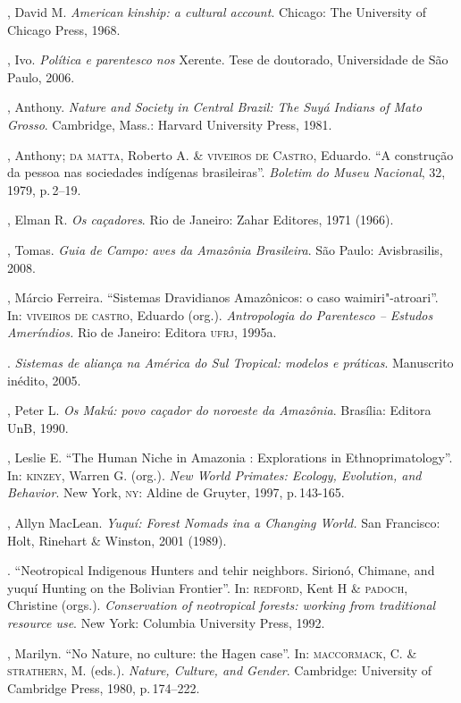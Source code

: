 \begin{bibliohedra}
, David M. \emph{American kinship: a cultural account}. Chicago: The
University of Chicago Press, 1968.

, Ivo. \emph{Política e parentesco nos} Xerente. Tese de
doutorado, Universidade de São Paulo, 2006.

, Anthony. \emph{Nature and Society in Central Brazil: The Suyá
Indians of Mato Grosso}. Cambridge, Mass.: Harvard University Press, 1981.

, Anthony; \textsc{da matta}, Roberto A. \& \textsc{viveiros de Castro}, Eduardo. ``A construção da pessoa nas sociedades indígenas
brasileiras''. \emph{Boletim do Museu Nacional}, 32, 1979, p.\,2--19.

, Elman R. \emph{Os caçadores}. Rio de Janeiro: Zahar Editores,
1971 (1966).

, Tomas. \emph{Guia de Campo: aves da Amazônia Brasileira}. São
Paulo: Avisbrasilis, 2008.

, Márcio Ferreira. ``Sistemas Dravidianos Amazônicos: o caso
waimiri"-atroari''. In: \textsc{viveiros de castro}, Eduardo (org.).
\emph{Antropologia do Parentesco -- Estudos Ameríndios.} Rio de Janeiro:
Editora \textsc{ufrj}, 1995a.

\titidem. \emph{Sistemas de aliança na América do Sul Tropical:
modelos e práticas}. Manuscrito inédito, 2005.

, Peter L. \emph{Os Makú: povo caçador do noroeste da Amazônia}.
Brasília: Editora UnB, 1990.

, Leslie E. ``The Human Niche in Amazonia : Explorations in
Ethnoprimatology''. In: \textsc{kinzey}, Warren G. (org.). \emph{New World Primates:
Ecology, Evolution, and Behavior}. New York, \textsc{ny}: Aldine de Gruyter, 1997, p.\,143-165.

, Allyn MacLean. \emph{Yuquí: Forest Nomads ina a Changing World.}
San Francisco: Holt, Rinehart \& Winston, 2001 (1989).

\titidem. ``Neotropical Indigenous Hunters and tehir neighbors.
Sirionó, Chimane, and yuquí Hunting on the Bolivian Frontier''. In:
\textsc{redford}, Kent H \& \textsc{padoch}, Christine (orgs.). \emph{Conservation of
neotropical forests: working from traditional resource use}. New York:
Columbia University Press, 1992.

, Marilyn. ``No Nature, no culture: the Hagen case''. In: \textsc{maccormack}, C. \& \textsc{strathern}, M. (eds.). \emph{Nature, Culture, and Gender}.
Cambridge: University of Cambridge Press, 1980, p.\,174--222.


\end{bibliohedra}
